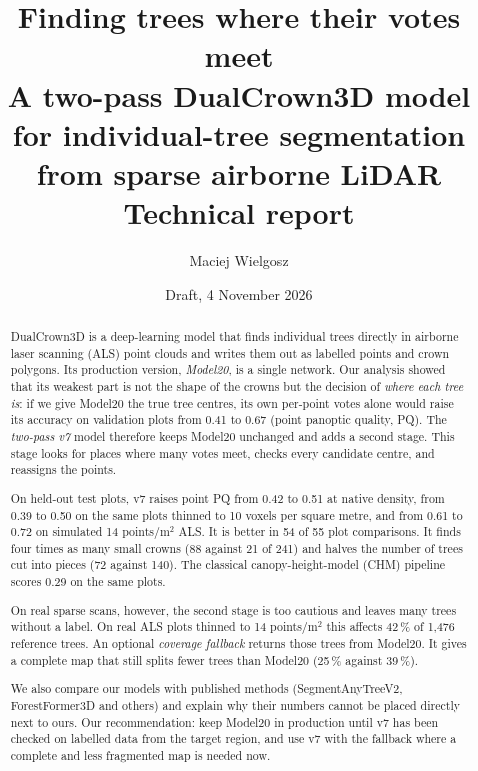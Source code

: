 \documentclass[11pt,a4paper]{article}
\title{\textbf{Finding trees where their votes meet}\\[4pt]
\large A two-pass DualCrown3D model for individual-tree segmentation\\ from sparse airborne LiDAR\\[6pt]
\normalsize Technical report}
\author{Maciej Wielgosz}
\date{Draft, 4 November 2026}
\begin{document}
\maketitle

\begin{abstract}
\noindent
DualCrown3D is a deep-learning model that finds individual trees directly in airborne laser scanning (ALS) point clouds and writes them out as labelled points and crown polygons. Its production version, \emph{Model20}, is a single network. Our analysis showed that its weakest part is not the shape of the crowns but the decision of \emph{where each tree is}: if we give Model20 the true tree centres, its own per-point votes alone would raise its accuracy on validation plots from 0.41 to 0.67 (point panoptic quality, PQ). The \emph{two-pass v7} model therefore keeps Model20 unchanged and adds a second stage. This stage looks for places where many votes meet, checks every candidate centre, and reassigns the points.

On held-out test plots, v7 raises point PQ from 0.42 to 0.51 at native density, from 0.39 to 0.50 on the same plots thinned to 10 voxels per square metre, and from 0.61 to 0.72 on simulated 14 points/m$^2$ ALS. It is better in 54 of 55 plot comparisons. It finds four times as many small crowns (88 against 21 of 241) and halves the number of trees cut into pieces (72 against 140). The classical canopy-height-model (CHM) pipeline scores 0.29 on the same plots.

On real sparse scans, however, the second stage is too cautious and leaves many trees without a label. On real ALS plots thinned to 14 points/m$^2$ this affects 42\,\% of 1,476 reference trees. An optional \emph{coverage fallback} returns those trees from Model20. It gives a complete map that still splits fewer trees than Model20 (25\,\% against 39\,\%).

We also compare our models with published methods (SegmentAnyTreeV2, ForestFormer3D and others) and explain why their numbers cannot be placed directly next to ours. Our recommendation: keep Model20 in production until v7 has been checked on labelled data from the target region, and use v7 with the fallback where a complete and less fragmented map is needed now.
\end{abstract}
\end{document}
